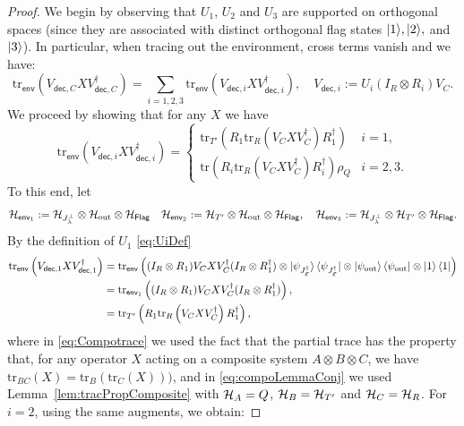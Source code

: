 \documentclass[10pt]{article}
\newcommand{\SOUT}{\mathrm{out}}
\newcommand{\tr}{\mathrm{tr}}
\newcommand{\p}[1]{\left(#1\right)}
\newcommand{\s}[1]{\mathsf{#1}}
\begin{document}
    \begin{proof}
        We begin by observing that $U_1$, $U_2$ and $U_3$ are supported on orthogonal spaces (since they are 
        associated with distinct orthogonal flag states $\ket{1}\!,\ket{2}\!,$ and $\ket{3}$). In particular, when tracing out the environment, cross terms vanish and we have:
        \begin{equation}
            \tr_{{\s{env}}}\p{V_{\s{dec},C}X V_{\s{dec},C}^\dag}=\sum_{i=1,2,3}\tr_{{\s{env}}}\p{V_{\s{dec},i}X V_{\s{dec},i}^\dag},\quad V_{\s{dec},i}:=U_i(I_{R}\otimes R_i)V_C.\label{eq:KeyForDilation0}
        \end{equation}
       We proceed by showing that for any $X$ we have
    \begin{equation}
        \tr_{\s{env}}\p{V_{\s{dec},i}XV_{\s{dec},i}^\dag}=\begin{cases}
        \tr_{{T'}}\p{R_1 \tr_{R}\p{V_C X V_C^\dag} R_1^\dag} & i=1,\\
        \tr\p{R_i \tr_{R}\p{V_C X V_C^\dag} R_i^\dag}\rho_Q & i=2,3.
    \end{cases} \label{eq:KeyForDilation}
    \end{equation}
    To this end, let 
    \[\calH_{\s{env}_1}:=\calH_{J_{\lambda}^\perp}\otimes \calH_{\SOUT}\otimes \calH_{\s{Flag}}\quad \calH_{\s{env}_2}:=\calH_{T'}\otimes \calH_{\SOUT}\otimes \calH_{\s{Flag}}, \quad \calH_{\s{env}_3}:=\calH_{J_{\lambda}^\perp}\otimes \calH_{T'}\otimes \calH_{\s{Flag}}.
    \]
By the definition of $U_1$ \eqref{eq:UiDef}
    \begin{align}
        \tr_{\s{env}}\p{V_{\s{dec},1}XV_{\s{dec},1}^\dag}\nonumber&=\tr_{\s{env}}\p{(I_{R}\otimes R_1)V_C X V_C^\dag(I_{R}\otimes R_1^\dag)\otimes \ket{\psi_{J_\calE^\dag}} \bra{\psi_{J_\calE^\dag}} \otimes \ket{\psi_{\SOUT}}\bra{\psi_{\SOUT}}\otimes \ket{1}\bra{1} }\\
        &\label{eq:Compotrace}=\tr_{{\s{env}_1}}\p{(I_{R}\otimes R_1)V_C X V_C^\dag(I_{R}\otimes R_1^\dag)},
        \\&=\tr_{{T'}}\p{R_1 \tr_{R}\p{V_C X V_C^\dag} R_1^\dag},\label{eq:compoLemmaConj}
    \end{align}
    where in \eqref{eq:Compotrace} we used the fact that the partial trace has the property that, for any operator $X$ acting on a composite system $A\otimes B\otimes C$, we have $\tr_{BC}(X)=\tr_B(\tr_C(X)))$, and in \eqref{eq:compoLemmaConj} we used Lemma~\ref{lem:tracPropComposite} with ${\cal H}_A=Q$, ${\cal H}_B={\cal H}_{T'}$ and ${\cal H}_{C}={\cal H}_R$.
    For $i=2$, using the same augments, we obtain:  

\end{proof}
\end{document}
